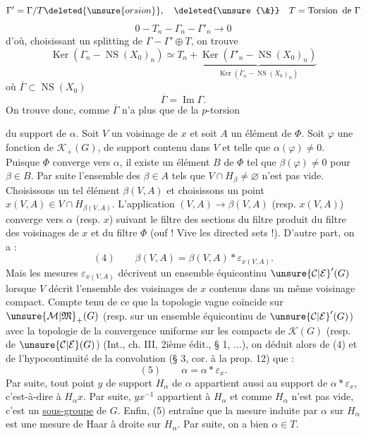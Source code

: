 \[
\Gamma'=\Gamma/T\deleted{\unsure{orsion}},\quad\deleted{\unsure{\&}}\quad T=\operatorname{Torsion}\text{ de }\Gamma
\]
\[
0\mathbin{-}T_n\mathbin{-}\Gamma_n\mathbin{-}\Gamma'_n\longrightarrow0
\]
d'où, choisissant un splitting de $\Gamma\mathbin{-}\Gamma'\oplus T$, on trouve
\[
\operatorname{Ker}(\Gamma_n\mathbin{-}\operatorname{NS}(X_0)_n)\simeq T_n+\underbrace{\operatorname{Ker}(\Gamma'_n\mathbin{-}\operatorname{NS}(X_0)_n)}_{\operatorname{Ker}(\overline\Gamma_n\mathbin{-}\operatorname{NS}(X_0)_n)}
\]
où $\overline\Gamma\subset\operatorname{NS}(X_0)$
\[
\overline\Gamma=\operatorname{Im}\Gamma.
\]
On trouve donc, comme $\overline\Gamma$ n'a plus que de la $p$-torsion

du support de $\alpha$. Soit $V$ un voisinage de $x$ et soit $A$ un élément de $\Phi$. Soit $\varphi$ une fonction de $\mathcal K_+(G)$, de support contenu dans $V$ et telle que $\alpha(\varphi)\ne 0$. Puisque $\Phi$ converge vers $\alpha$, il existe un élément $B$ de $\Phi$ tel que $\beta(\varphi)\ne 0$ pour $\beta\in B$. Par suite l'ensemble des $\beta\in A$ tels que $V\cap H_\beta\ne\varnothing$ n'est pas vide. Choisissons un tel élément $\beta(V,A)$ et choisissons un point $x(V,A)\in V\cap H_{\beta(V,A)}$. L'application $(V,A)\longrightarrow\beta(V,A)$ (resp. $x(V,A)$) converge vers $\alpha$ (resp. $x$) suivant le filtre des sections du filtre produit du filtre des voisinages de $x$ et du filtre $\Phi$ (ouf ! Vive les directed sets !). D'autre part, on a :
\[
(4)\qquad\beta(V,A)=\beta(V,A)*\varepsilon_{x(V,A)}.
\]
Mais les mesures $\varepsilon_{x(V,A)}$ décrivent un ensemble équicontinu $\unsure{\mathcal C|\mathcal E}'(G)$ lorsque $V$ décrit l'ensemble des voisinages de $x$ contenus dans un même voisinage compact. Compte tenu de ce que la topologie vague coïncide sur $\unsure{\mathcal M|\mathfrak M}_+(G)$ (resp. sur un ensemble équicontinu de $\unsure{\mathcal C|\mathcal E}'(G)$) avec la topologie de la convergence uniforme sur les compacts de $\mathcal K(G)$ (resp. de $\unsure{\mathcal C|\mathcal E}(G)$) (Int., ch. III, 2ième édit., § 1, $\ldots$), on déduit alors de (4) et de l'hypocontinuité de la convolution (§ 3, cor. à la prop. 12) que :
\[
(5)\qquad\alpha=\alpha*\varepsilon_x.
\]
Par suite, tout point $y$ de support $H_\alpha$ de $\alpha$ appartient aussi au support de $\alpha*\varepsilon_x$, c'est-à-dire à $H_\alpha x$. Par suite, $yx^{-1}$ appartient à $H_\alpha$ et comme $H_\alpha$ n'est pas vide, c'est un \uline{sous-groupe} de $G$. Enfin, (5) entraîne que la mesure induite par $\alpha$ sur $H_\alpha$ est une mesure de Haar à droite sur $H_\alpha$. Par suite, on a bien $\alpha\in T$.

